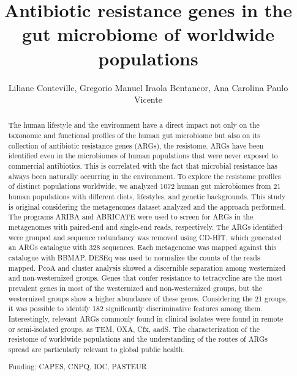 \documentclass[twoside]{article}
\title{\vspace{-15mm}\fontsize{24pt}{10pt}\selectfont\textbf{ Antibiotic resistance genes in the gut microbiome of worldwide populations }} %
\author{ Liliane Conteville, Gregorio Manuel Iraola Bentancor, Ana Carolina Paulo Vicente }
\affil{ Oswaldo Cruz Institute }
\date{}
\begin{document}
  
  
  \maketitle %
  
  
  \thispagestyle{fancy} %
  
  
  \begin{abstract}
  The human lifestyle and the environment have a direct impact not only on the taxonomic and functional profiles of the human gut microbiome but also on its collection of antibiotic resistance genes (ARGs),  the resistome. ARGs have been identified even in the microbiomes of human populations that were never exposed to commercial antibiotics. This is correlated with the fact that microbial resistance has always been naturally occurring in the environment. To explore the resistome profiles of distinct populations worldwide,  we analyzed 1072 human gut microbiomes from 21 human populations with different diets,  lifestyles,  and genetic backgrounds. This study is original considering the metagenomes dataset analyzed and the approach performed. The programs ARIBA and ABRICATE were used to screen for ARGs in the metagenomes with paired-end and single-end reads,  respectively. The ARGs identified were grouped and sequence redundancy was removed using CD-HIT,  which generated an ARGs catalogue with 328 sequences. Each metagenome was mapped against this catalogue with BBMAP. DESEq was used to normalize the counts of the reads mapped. PcoA and cluster analysis showed a discernible separation among westernized and non-westernized groups. Genes that confer resistance to tetracycline are the most prevalent genes in most of the westernized and non-westernized groups,  but the westernized groups show a higher abundance of these genes. Considering the 21 groups,  it was possible to identify 182 significantly discriminative features among them. Interestingly,  relevant ARGs commonly found in clinical isolates were found in remote or semi-isolated groups,  as TEM,  OXA,  Cfx,  aadS. The characterization of the resistome of worldwide populations and the understanding of the routes of ARGs spread are particularly relevant to global public health.
  
  Funding: CAPES,  CNPQ,  IOC,  PASTEUR \\ 
  \end{abstract}
  
\end{document}
